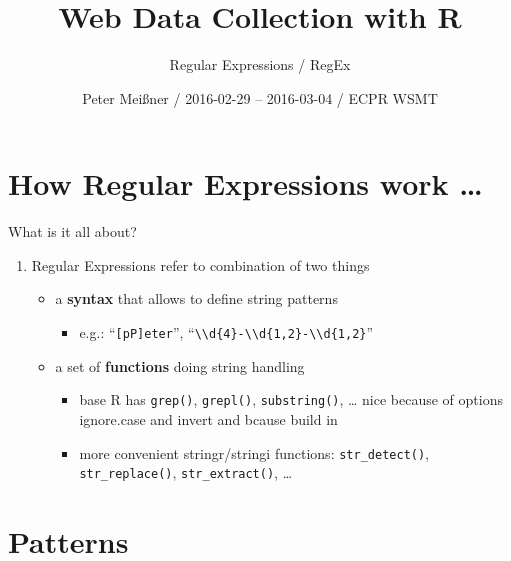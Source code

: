 \documentclass[ignorenonframetext,]{beamer}
\title{Web Data Collection with R}
\subtitle{Regular Expressions / RegEx}
\author{Peter Meißner / 2016-02-29 -- 2016-03-04 / ECPR WSMT}
\date{}
\providecommand{\tightlist}{%
  \setlength{\itemsep}{0pt}\setlength{\parskip}{0pt}}
\begin{document}
\frame{\titlepage}

\begin{frame}
\tableofcontents[hideallsubsections]
\end{frame}

\section{How Regular Expressions work
\ldots{}}\label{how-regular-expressions-work}

\begin{frame}[fragile]{What is it all about?}

\begin{enumerate}
\def\labelenumi{\arabic{enumi})}
\tightlist
\item
  Regular Expressions refer to combination of two things

  \begin{itemize}
  \tightlist
  \item
    a \textbf{syntax} that allows to define string patterns

    \begin{itemize}
    \tightlist
    \item
      e.g.: ``\texttt{{[}pP{]}eter}'',
      ``\texttt{\textbackslash{}\textbackslash{}d\{4\}-\textbackslash{}\textbackslash{}d\{1,2\}-\textbackslash{}\textbackslash{}d\{1,2\}}''
    \end{itemize}
  \item
    a set of \textbf{functions} doing string handling

    \begin{itemize}
    \tightlist
    \item
      base R has \texttt{grep()}, \texttt{grepl()},
      \texttt{substring()}, \ldots{} nice because of options ignore.case
      and invert and bcause build in
    \item
      more convenient stringr/stringi functions: \texttt{str\_detect()},
      \texttt{str\_replace()}, \texttt{str\_extract()}, \ldots{}
    \end{itemize}
  \end{itemize}
\end{enumerate}

\end{frame}

\section{Patterns}\label{patterns}
\end{document}
